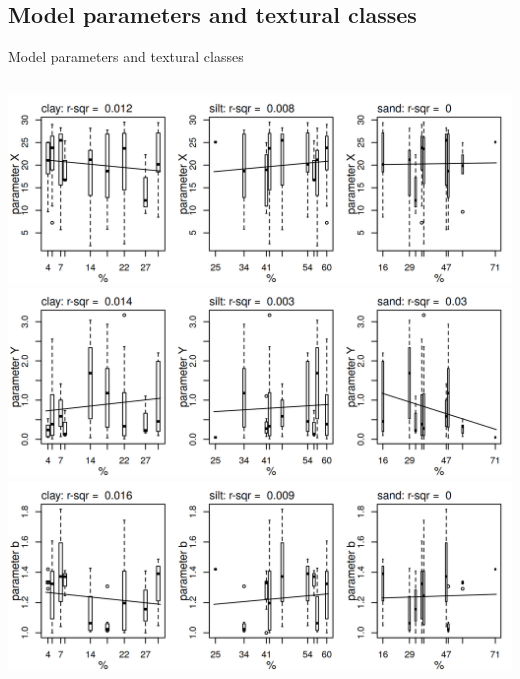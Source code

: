 \subsection{Model parameters and textural classes}
\begin{block}{Model parameters and textural classes}
\begin{columns}
    \begin{column}{0.2\textwidth}
    \end{column}
    \begin{column}{0.6\textwidth}
    \end{column}
\end{columns}
        \includegraphics[width = \textwidth]{obr/Xfittex.png}
        \includegraphics[width = \textwidth]{obr/Yfittex.png}
        \includegraphics[width = \textwidth]{obr/bfittex.png}
\end{block}


